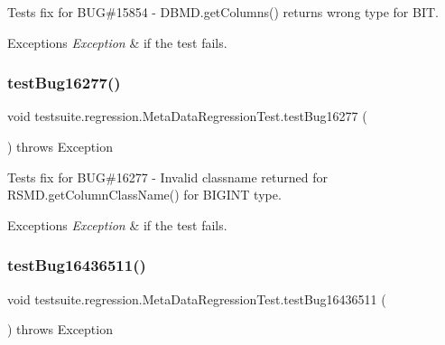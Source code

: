 Tests fix for B\+UG\#15854 -\/ D\+B\+M\+D.\+get\+Columns() returns wrong type for B\+IT.


\begin{DoxyExceptions}{Exceptions}
{\em Exception} & if the test fails. \\
\hline
\end{DoxyExceptions}
\mbox{\label{classtestsuite_1_1regression_1_1_meta_data_regression_test_a7ddf69bf32cb524239b07b822585d44d}} 
\subsubsection{\texorpdfstring{test\+Bug16277()}{testBug16277()}}
{\footnotesize\ttfamily void testsuite.\+regression.\+Meta\+Data\+Regression\+Test.\+test\+Bug16277 (\begin{DoxyParamCaption}{ }\end{DoxyParamCaption}) throws Exception}

Tests fix for B\+UG\#16277 -\/ Invalid classname returned for R\+S\+M\+D.\+get\+Column\+Class\+Name() for B\+I\+G\+I\+NT type.


\begin{DoxyExceptions}{Exceptions}
{\em Exception} & if the test fails. \\
\hline
\end{DoxyExceptions}
\mbox{\label{classtestsuite_1_1regression_1_1_meta_data_regression_test_a1fd3d694ae818586b9e77cceb5bfbbb3}} 
\subsubsection{\texorpdfstring{test\+Bug16436511()}{testBug16436511()}}
{\footnotesize\ttfamily void testsuite.\+regression.\+Meta\+Data\+Regression\+Test.\+test\+Bug16436511 (\begin{DoxyParamCaption}{ }\end{DoxyParamCaption}) throws Exception}

